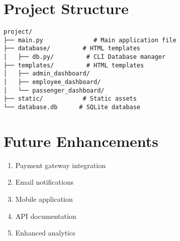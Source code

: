 \documentclass{article}
\begin{document}
\section{Project Structure}
\begin{verbatim}
project/
├── main.py              # Main application file         
├── database/         # HTML templates
│   ├── db.py/         # CLI Database manager
├── templates/         # HTML templates
│   ├── admin_dashboard/
│   ├── employee_dashboard/
│   └── passenger_dashboard/
├── static/           # Static assets
└── database.db      # SQLite database
\end{verbatim}

\section{Future Enhancements}
\begin{enumerate}
    \item Payment gateway integration
    \item Email notifications
    \item Mobile application
    \item API documentation
    \item Enhanced analytics
\end{enumerate}
\end{document}
